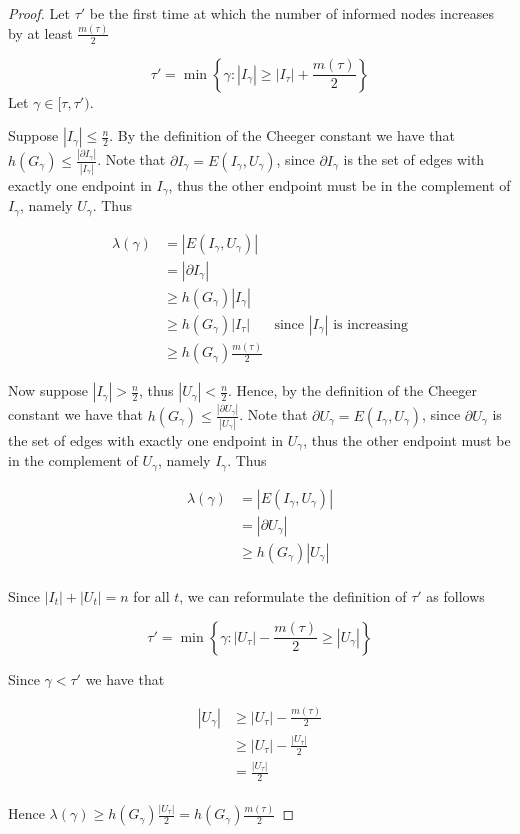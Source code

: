 \documentclass[a4paper,11pt]{article}
\theoremstyle{definition}
\begin{document}
\begin{proof}

	Let $\tau'$ be the first time at which the number of informed nodes increases by at least $\frac{m(\tau)}{2}$ 
	
	$$
		\tau' = \min\left\{\gamma : |I_{\gamma}| \geq |I_\tau| + \frac{m(\tau)}{2}\right\}
	$$
	Let $ \gamma \in [\tau, \tau')$.

	Suppose  $|I_\gamma| \leq \frac{n}{2}$. By the definition of the Cheeger constant we have that $h(G_\gamma) \leq \frac{|\partial I_\gamma|}{|I_\gamma|}$. Note that $ \partial I_\gamma = E(I_\gamma, U_\gamma)$, since $\partial I_\gamma$ is the set of edges with exactly one endpoint in $I_\gamma$, thus the other endpoint must be in the complement of $I_\gamma$, namely $U_\gamma$. Thus

	\begin{align*}
		\lambda(\gamma) &= |E(I_\gamma, U_\gamma)| \\
		& = |\partial I_\gamma| \\
		& \geq h(G_\gamma) |I_\gamma| \\
		& \geq h(G_\gamma) |I_\tau| & \text{since } |I_\gamma| \text{ is increasing} \\
		& \geq h(G_\gamma) \frac{m(\tau)}{2}
	\end{align*}
		
	Now suppose $|I_\gamma| > \frac{n}{2}$, thus $|U_\gamma| < \frac{n}{2}$. Hence, by the definition of the Cheeger constant we have that $h(G_\gamma) \leq \frac{|\partial U_\gamma|}{|U_\gamma|}$. Note that $ \partial U_\gamma = E(I_\gamma, U_\gamma)$, since $\partial U_\gamma$ is the set of edges with exactly one endpoint in $U_\gamma$,  thus the other endpoint must be in the complement of $U_\gamma$, namely $I_\gamma$. Thus 

	\begin{align*}
		\lambda(\gamma) &= |E(I_\gamma, U_\gamma)| \\
		& = |\partial U_\gamma| \\
		& \geq h(G_\gamma) |U_\gamma| \\
	\end{align*} 

	Since $|I_t| + |U_t| = n$ for all $t$, we can reformulate the definition of $\tau'$ as follows

	$$
		\tau' = \min \left\{ \gamma : |U_\tau| - \frac{m(\tau)}{2} \geq |U_\gamma| \right\} 
	$$ 
	
	Since $\gamma < \tau'$ we have that

	\begin{align*}
		|U_\gamma| & \geq |U_\tau| - \frac{m(\tau)}{2} \\
		& \geq |U_\tau| - \frac{|U_\tau|}{2} \\
		& = \frac{|U_\tau|}{2} \\
	\end{align*}
	
	Hence $\lambda(\gamma) \geq h(G_\gamma)\frac{|U_\tau|}{2} = h(G_\gamma)\frac{m(\tau)}{2}$

\end{proof}
\end{document}
